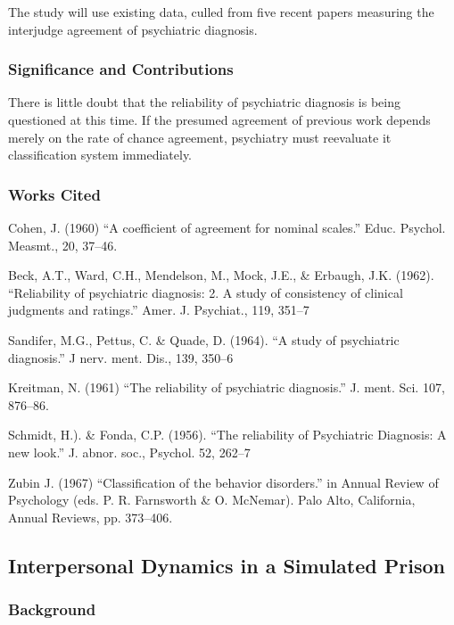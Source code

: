 \begin{refsection}
The study will use existing data, culled from five recent papers measuring the interjudge agreement of psychiatric diagnosis.

\subsubsection{Significance and Contributions}
\label{significanceandcontributions}

There is little doubt that the reliability of psychiatric diagnosis is being questioned at this time. If the presumed agreement of previous work depends merely on the rate of chance agreement, psychiatry must reevaluate it classification system immediately.

\subsubsection{Works Cited}
\label{workscited}

Cohen, J. (1960) “A coefficient of agreement for nominal scales.” Educ. Psychol. Measmt., 20, 37--46.

Beck, A.T., Ward, C.H., Mendelson, M., Mock, J.E., \& Erbaugh, J.K. (1962). “Reliability of psychiatric diagnosis: 2. A study of consistency of clinical judgments and ratings.” Amer. J. Psychiat., 119, 351--7

Sandifer, M.G., Pettus, C. \& Quade, D. (1964). “A study of psychiatric diagnosis.” J nerv. ment. Dis., 139, 350--6

Kreitman, N. (1961) “The reliability of psychiatric diagnosis.” J. ment. Sci. 107, 876--86.

Schmidt, H.). \& Fonda, C.P. (1956). “The reliability of Psychiatric Diagnosis: A new look.” J. abnor. soc., Psychol. 52, 262--7

Zubin J. (1967) “Classification of the behavior disorders.” in Annual Review of Psychology (eds. P. R. Farnsworth \& O. McNemar). Palo Alto, California, Annual Reviews, pp. 373--406.

\newpage

\subsection{Interpersonal Dynamics in a Simulated Prison}
\label{interpersonaldynamicsinasimulatedprison}

\subsubsection{Background}
\label{background}


\end{refsection}
